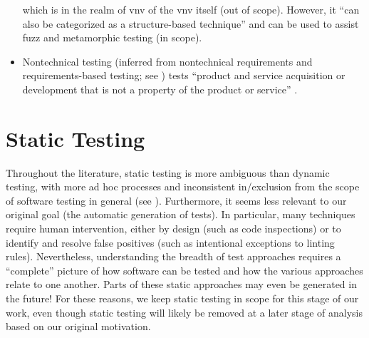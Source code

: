 \begin{itemize}
          which is in the realm of \acs{vnv} of the \acs{vnv} itself (out of
          scope). However, it ``can also be categorized as a structure-based
          technique'' and can be used to assist fuzz and metamorphic testing
          \citep[p.~5-15]{SWEBOK2024} (in scope).
          \ifnotpaper
    \item {}\label{nontech-req-test}
          Nontechnical testing (inferred from nontechnical requirements
          \citep[p.~293]{IEEE2017} and requirements-based testing; see
          ) tests ``product and service acquisition or
          development that is not a property of the product or service''
          \citep[p.~293]{IEEE2017}.
          \fi
\end{itemize}

\section{Static Testing}\label{static-test}
Throughout the literature, static testing is more ambiguous than dynamic
testing, with more ad hoc processes and inconsistent in/exclusion from the
scope of software testing in general (see ).
Furthermore, it seems less relevant to our
original goal (the automatic generation of tests). In particular, many
techniques require human intervention, either by design (such as code
inspections) or to identify and resolve false positives (such as
intentional exceptions to linting rules). Nevertheless, understanding
the breadth of test approaches requires a ``complete'' picture of how
software can be tested and how the various approaches relate to one another.
Parts of these static approaches may even be generated in the
future! For these reasons, we keep static testing in scope for this stage
of our work, even though static testing will likely be removed at a later
stage of analysis based on our original motivation.



